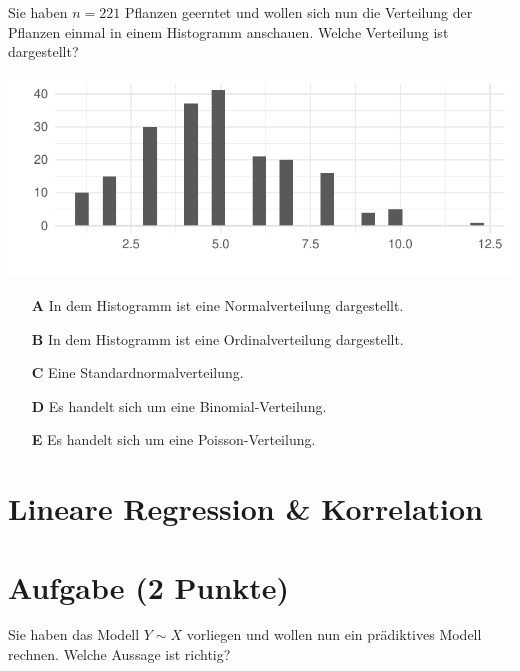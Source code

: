 \documentclass[a4paper, 9pt]{scrartcl}\usepackage[]{graphicx}\usepackage[]{xcolor}
\makeatletter
\def\maxwidth{ %
  \ifdim\Gin@nat@width>\linewidth
    \linewidth
  \else
    \Gin@nat@width
  \fi
}
\makeatother
\begin{document}
Sie haben $n = 221$ Pflanzen geerntet und wollen sich nun die Verteilung der Pflanzen einmal in einem Histogramm anschauen. Welche Verteilung ist dargestellt?



{\centering \includegraphics[width=\maxwidth]{img/mc-distribution-02-a-1} 

}







\begin{enumerate}
\item [\textbf{A} \msquare] In dem Histogramm ist eine Normalverteilung dargestellt.
\item [\textbf{B} \msquare] In dem Histogramm ist eine Ordinalverteilung dargestellt.
\item [\textbf{C} \msquare] Eine Standardnormalverteilung.
\item [\textbf{D} \msquare] Es handelt sich um eine Binomial-Verteilung.
\item [\textbf{E} \msquare] Es handelt sich um eine Poisson-Verteilung.
\end{enumerate} 
\section*{Lineare Regression \& Korrelation}

\section{Aufgabe \hfill (2 Punkte)}



Sie haben das Modell $Y \sim X$ vorliegen und wollen nun ein prädiktives Modell rechnen. Welche Aussage ist richtig?
\end{document}
